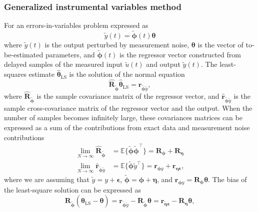 \subsubsection{Generalized instrumental variables method}
For an errors-in-variables problem expressed as
\begin{equation} \widetilde{y}(t) = \widetilde{\bm{\phi}}(t) \bm{\theta}   \end{equation}
where $\widetilde{y}(t)$ is the output perturbed by measurement noise, $\bm{\theta}$ is the vector of to-be-estimated parameters, and $\widetilde{\bm{\phi}}(t)$ is the regressor vector constructed from delayed samples of the measured input $\widetilde{u}(t)$ and output $\widetilde{y}(t)$.
The least-squares estimate $\widehat{\bm{\theta}}_{\mathrm{LS}}$ is the solution of the normal equation
\begin{equation} \widehat{\mathbf{R}}_{\widetilde{\bm{\phi}}} \widehat{\bm{\theta}}_{\mathrm{LS}} = \widehat{\mathbf{r}}_{\widetilde{\bm{\phi}} \widetilde{y}} , \label{eqn:norm} \end{equation}
where $\widehat{\mathbf{R}}_{\widetilde{\bm{\phi}}}$ is the sample covariance matrix of the regressor vector, and $\widehat{\mathbf{r}}_{\widetilde{\bm{\phi}} \widetilde{y}}$ is the sample cross-covariance matrix of the regressor vector and the output.
When the number of samples becomes infinitely large, these covariances matrices can be expressed as a sum of the contributions from exact data and measurement noise contributions
\begin{equation} \begin{aligned} \lim\limits_{N \rightarrow \infty} \widehat{\mathbf{R}}_{\widetilde{\bm{\phi}}} &= \mathbb{E} \{ \widetilde{\bm{\phi}} \widetilde{\bm{\phi}}^\top \} = \mathbf{R}_{\bm{\phi}} + \mathbf{R}_{\bm{\eta}} \\ \lim\limits_{N \rightarrow \infty} \widehat{\mathbf{r}}_{\widetilde{\bm{\phi}} \widetilde{y}}  &=  \mathbb{E} \{ \widetilde{\bm{\phi}} \widetilde{y}^\top \} = \mathbf{r}_{\bm{\phi} y} + \mathbf{r}_{\bm{\eta} \bm{\epsilon}} , \end{aligned} \end{equation}
where we are assuming that $\widetilde{y} =  y + \bm{\epsilon}$, $\widetilde{\bm{\phi}} = \bm{\phi} + \bm{\eta}$, and $\mathbf{r}_{\bm{\phi} y} = \mathbf{R}_{{\bm{\phi}}} \bm{\theta}$.
The bias of the least-square solution can be expressed as 
\begin{equation} \mathbf{R}_{\widetilde{\bm{\phi}}} \left( \widehat{\bm{\theta}}_{\mathrm{LS}} - \bm{\theta} \right) = \mathbf{r}_{\widetilde{\bm{\phi}} \widetilde{y}} - \mathbf{R}_{\widetilde{\bm{\phi}}} \bm{\theta} = \mathbf{r}_{\widetilde{\bm{\eta}} \bm{\epsilon}} - \mathbf{R}_{\bm{\eta}} \bm{\theta} , \end{equation}


